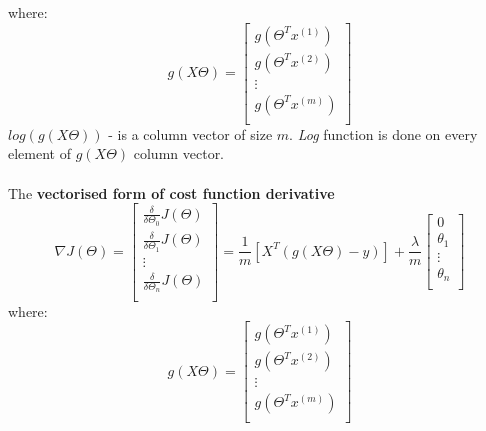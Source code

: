 \documentclass{article}
\begin{document}
\color{black}
where:
\begin{equation*} 
g(X\Theta) = 
\begin{bmatrix} 
g(\Theta^Tx^{(1)}) \\ 
g(\Theta^Tx^{(2)}) \\
\vdots \\
g(\Theta^Tx^{(m)})\\
\end{bmatrix}
\end{equation*} 
$log(g(X\Theta))$ - is a column vector of size $m$. \textit{Log} function is done on every element of $g(X\Theta)$ column vector.   
\\
\\
The \textbf{vectorised form of cost function derivative}
\color{red}
\begin{equation}
\nabla J(\Theta) = 
\begin{bmatrix} 
\frac{\delta}{\delta\Theta_0}J(\Theta)\\ 
\frac{\delta}{\delta\Theta_1}J(\Theta) \\
\vdots \\
\frac{\delta}{\delta\Theta_n}J(\Theta)\\
\end{bmatrix}  
= \frac{1}{m}
\left[X^T(g(X\Theta)-y)\right]
+ \frac{\lambda}{m}
\begin{bmatrix} 
0 \\ 
\theta_1 \\
\vdots \\
\theta_n\\
\end{bmatrix}
\end{equation}
\color{black}
where:
\begin{equation*} 
g(X\Theta) = 
\begin{bmatrix} 
g(\Theta^Tx^{(1)}) \\ 
g(\Theta^Tx^{(2)}) \\
\vdots \\
g(\Theta^Tx^{(m)})\\
\end{bmatrix}
\end{equation*} 
\end{document}
